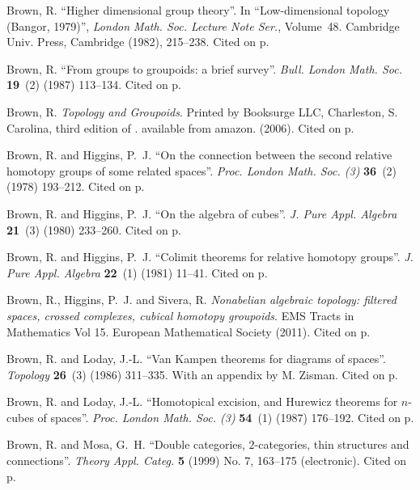 \documentclass{elsarticle}
\begin{document}
\begin{thebibliography}{MLW50}
Brown, R.
\newblock \enquote{Higher dimensional group theory}.
\newblock In \enquote{Low-dimensional topology (Bangor, 1979)}, \emph{London
  Math. Soc. Lecture Note Ser.}, Volume~48. Cambridge Univ. Press, Cambridge
  (1982), 215--238. Cited on p.

Brown, R.
\newblock \enquote{From groups to groupoids: a brief survey}.
\newblock \emph{Bull. London Math. Soc.} \textbf{19}~(2) (1987) 113--134.  Cited on p.

Brown, R.
\newblock \emph{Topology and {G}roupoids}.
\newblock Printed by Booksurge LLC, Charleston, S. Carolina, third edition of
\cite{Brown-elements}. available from amazon.   (2006).  Cited on p.

Brown, R. and Higgins, P.~J.
\newblock \enquote{On the connection between the second relative homotopy
  groups of some related spaces}.
\newblock \emph{Proc. London Math. Soc. (3)} \textbf{36}~(2) (1978) 193--212.  Cited on p.

Brown, R. and Higgins, P.~J.
\newblock \enquote{On the algebra of cubes}.
\newblock \emph{J. Pure Appl. Algebra} \textbf{21}~(3) (1980) 233--260.  Cited on p.

Brown, R. and Higgins, P.~J.
\newblock \enquote{Colimit theorems for relative homotopy groups}.
\newblock \emph{J. Pure Appl. Algebra} \textbf{22}~(1) (1981) 11--41. Cited on p.

Brown, R., Higgins, P.~J. and Sivera, R.
\newblock \emph{Nonabelian algebraic topology: filtered spaces, crossed
  complexes, cubical homotopy groupoids}.
\newblock EMS Tracts in Mathematics Vol 15. European Mathematical Society
  (2011).  Cited on p.

Brown, R. and Loday, J.-L.
\newblock \enquote{Van {K}ampen theorems for diagrams of spaces}.
\newblock \emph{Topology} \textbf{26}~(3) (1986) 311--335.
\newblock With an appendix by M. Zisman.  Cited on p.

Brown, R. and Loday, J.-L.
\newblock \enquote{Homotopical excision, and {H}urewicz theorems for
  {$n$}-cubes of spaces}.
\newblock \emph{Proc. London Math. Soc. (3)} \textbf{54}~(1) (1987) 176--192.  Cited on p.

Brown, R. and Mosa, G.~H.
\newblock \enquote{Double categories, {$2$}-categories, thin structures and
  connections}.
\newblock \emph{Theory Appl. Categ.} \textbf{5} (1999) No. 7, 163--175
  (electronic).  Cited on p.


\end{thebibliography}
\end{document}
